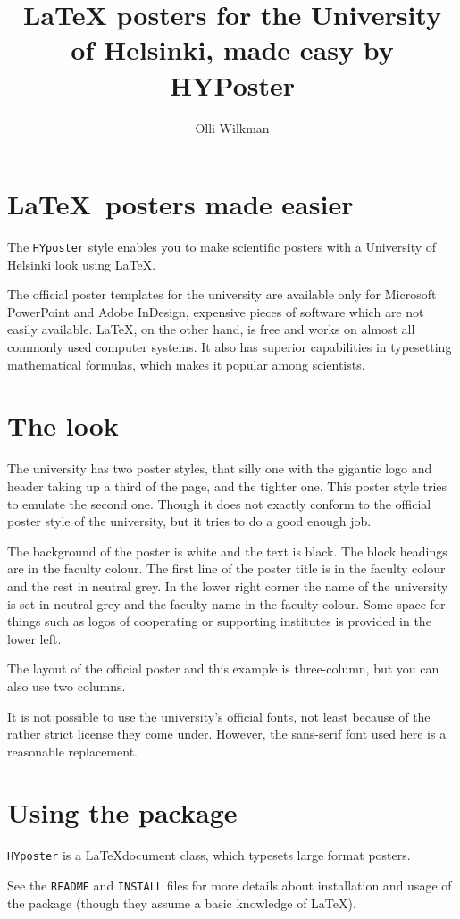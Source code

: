 \documentclass[a0paper,smallertitle]{HYposter}
\title{\LaTeX{} posters for the University of Helsinki, made easy by HYPoster}
\author{Olli Wilkman}
\affiliation{Department of Physics, University of Helsinki}
\begin{document}
\section*{\LaTeX~posters made easier}
The \texttt{HYposter} style enables you to make scientific posters with a University of Helsinki look using \LaTeX. 

The official poster templates for the university are available only for Microsoft PowerPoint and Adobe InDesign, expensive pieces of software which are not easily available. \LaTeX, on the other hand, is free and works on almost all commonly used computer systems. It also has superior capabilities in typesetting mathematical formulas, which makes it popular among scientists.


\section*{The look}
The university has two poster styles, that silly one with the gigantic logo and header taking up a third of the page, and the tighter one. This poster style tries to emulate the second one. Though it does not exactly conform to the official poster style of the university, but it tries to do a good enough job. 

The background of the poster is white and the text is black. The block headings are in the faculty colour. The first line of the poster title is in the faculty colour and the rest in neutral grey. In the lower right corner the name of the university is set in neutral grey and the faculty name in the faculty colour.
Some space for things such as logos of cooperating or supporting institutes is provided in the lower left.

The layout of the official poster and this example is three-column, but you can also use two columns.

It is not possible to use the university's official fonts, not least because of the rather strict license they come under. However, the sans-serif font used here is a reasonable replacement.


\section*{Using the package}
\texttt{HYposter} is a \LaTeX document class, which typesets large format posters.

See the \texttt{README} and \texttt{INSTALL} files for more details about installation and usage of the package (though they assume a basic knowledge of \LaTeX).
\end{document}
